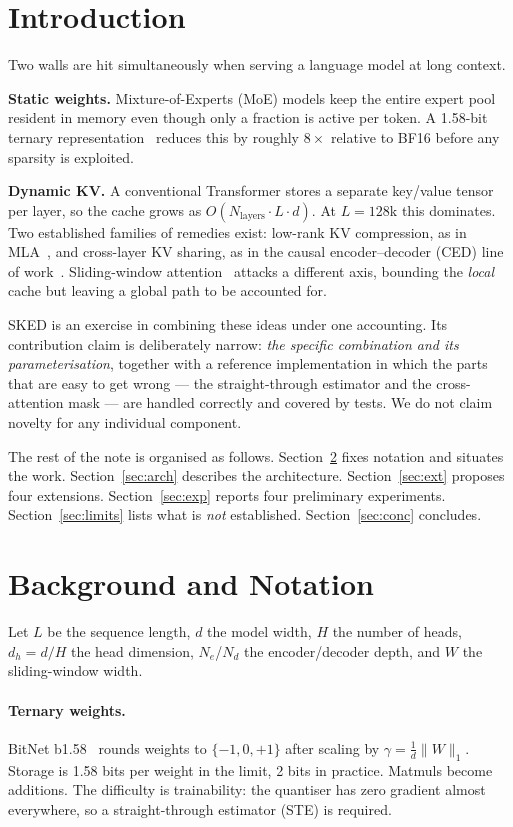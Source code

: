 \documentclass[10pt,conference]{IEEEtran}
\begin{document}
\section{Introduction}

Two walls are hit simultaneously when serving a language model at long context.

\textbf{Static weights.} Mixture-of-Experts (MoE) models keep the entire expert pool
resident in memory even though only a fraction is active per token. A 1.58-bit ternary
representation~\cite{bitnet158} reduces this by roughly $8\times$ relative to BF16
before any sparsity is exploited.

\textbf{Dynamic KV.} A conventional Transformer stores a separate key/value tensor per
layer, so the cache grows as $O(N_{\text{layers}} \cdot L \cdot d)$. At $L = 128$k this
dominates. Two established families of remedies exist: low-rank KV compression, as in
MLA~\cite{deepseekv3}, and cross-layer KV sharing, as in the causal
encoder--decoder (CED) line of work~\cite{yoco}. Sliding-window
attention~\cite{longformer,mistral,gemma2} attacks a different axis, bounding the
\emph{local} cache but leaving a global path to be accounted for.

SKED is an exercise in combining these ideas under one accounting. Its contribution
claim is deliberately narrow: \emph{the specific combination and its parameterisation},
together with a reference implementation in which the parts that are easy to get wrong
--- the straight-through estimator and the cross-attention mask --- are handled
correctly and covered by tests. We do not claim novelty for any individual component.

The rest of the note is organised as follows. Section~\ref{sec:bg} fixes notation and
situates the work. Section~\ref{sec:arch} describes the architecture.
Section~\ref{sec:ext} proposes four extensions. Section~\ref{sec:exp} reports four
preliminary experiments. Section~\ref{sec:limits} lists what is \emph{not} established.
Section~\ref{sec:conc} concludes.

\section{Background and Notation}\label{sec:bg}

Let $L$ be the sequence length, $d$ the model width, $H$ the number of heads,
$d_h = d/H$ the head dimension, $N_e$/$N_d$ the encoder/decoder depth, and $W$ the
sliding-window width.

\paragraph{Ternary weights.} BitNet b1.58~\cite{bitnet158} rounds weights to
$\{-1,0,+1\}$ after scaling by $\gamma = \frac{1}{d}\lVert W \rVert_1$. Storage is
1.58 bits per weight in the limit, 2 bits in practice. Matmuls become additions. The
difficulty is trainability: the quantiser has zero gradient almost everywhere, so a
straight-through estimator (STE) is required.
\end{document}
